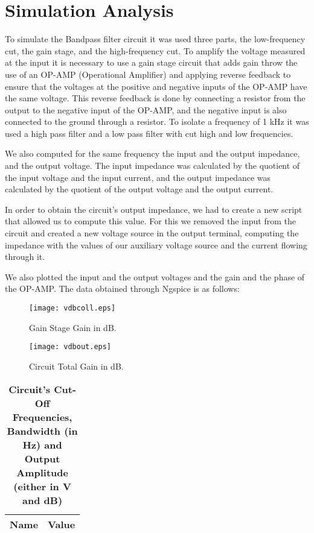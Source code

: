 \section{Simulation Analysis}
\label{sec:simulation}
To simulate the Bandpass filter circuit it was used three parts, the low-frequency cut, the gain stage, and the high-frequency cut.
To amplify the voltage measured at the input it is necessary to use a gain stage circuit that adds gain throw the use of an OP-AMP (Operational Amplifier) and applying reverse feedback to ensure that the voltages at the positive and negative inputs of the OP-AMP have the same voltage. This reverse feedback is done by connecting a resistor from the output to the negative input of the OP-AMP, and the negative input is also connected to the ground through a resistor.
To isolate a frequency of 1 kHz it was used a high pass filter and a low pass filter with cut high and low frequencies.

We also computed for the same frequency the input and the output impedance, and the output voltage. The input impedance was calculated by the quotient of the input voltage and the input current, and the output impedance was calculated by the quotient of the output voltage and the output current.

In order to obtain the circuit's output impedance, we had to create a new script that allowed us to compute this value. For this we removed the input from the circuit and created a new voltage source in the output terminal, computing the impedance with the values of our auxiliary voltage source and the current flowing through it.

We also plotted the input and the output voltages and the gain and the phase of the OP-AMP.
The data obtained through Ngspice is as follows:

\begin{figure}[h] 
\centering
\texttt{[image: vdbcoll.eps]}
\caption{Gain Stage Gain in dB.}
\label{Fig3: GainStgGaindB}
\end{figure}

\begin{figure}[h] 
\centering
\texttt{[image: vdbout.eps]}
\caption{Circuit Total Gain in dB.}
\label{Fig4: SimGaindB}
\end{figure}

\begin{table}[H]
\centering
\begin{tabular}{|l|l|}
\hline
{\bf Name} & {\bf Value} \\ \hline
    
\end{tabular}
\caption{\textbf{Circuit's Cut-Off Frequencies, Bandwidth (in Hz) and Output Amplitude (either in V and dB)}}
\end{table}

